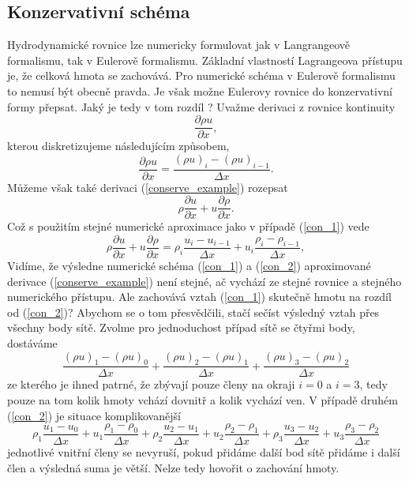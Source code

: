 \subsection{Konzervativní schéma}
Hydrodynamické rovnice lze numericky formulovat jak v Langrangeově formalismu, tak v Eulerově formalismu. Základní vlastností Lagrangeova přístupu je, že celková hmota se zachovává. Pro numerické schéma v Eulerově formalismu to nemusí být obecně pravda. Je však možne Eulerovy rovnice do konzervativní formy přepsat. Jaký je tedy v tom rozdíl ? Uvažme derivaci z rovnice kontinuity
\begin{equation}
\label{conserve_example}
\frac{\partial \rho u}{\partial x},
\end{equation}
kterou diskretizujeme následujícím způsobem,
\begin{equation}
\label{con_1}
\frac{\partial \rho u}{\partial x}=\frac{(\rho u)_{i}-(\rho u)_{i-1}}{\Delta x}.
\end{equation}
Můžeme však také derivaci (\ref{conserve_example}) rozepsat
\begin{equation}
\rho \frac{\partial u}{\partial x}+u\frac{\partial \rho}{\partial x}.
\end{equation}
Což s použitím stejné numerické aproximace jako v případě (\ref{con_1}) vede
\begin{equation}
\label{con_2}
\rho \frac{\partial u}{\partial x}+u\frac{\partial \rho}{\partial x} = \rho_i\frac{u_i-u_{i-1}}{\Delta x}+u_i\frac{\rho_i-\rho_{i-1}}{\Delta x},
\end{equation}
Vidíme, že výsledne numerické schéma (\ref{con_1}) a (\ref{con_2}) aproximované derivace (\ref{conserve_example}) není stejné, ač vychází ze stejné 
rovnice a stejného numerického přístupu. Ale zachovává vztah (\ref{con_1}) skutečně hmotu na rozdíl od (\ref{con_2})? Abychom se o tom přesvědčili, stačí 
sečíst výsledný vztah přes všechny body sítě.  Zvolme pro jednoduchost případ sítě se čtyřmi body, dostáváme
\begin{equation}
\label{conserve_form_expl_1}
\frac{(\rho u)_{1}-(\rho u)_{0}}{\Delta x}+\frac{(\rho u)_{2}-(\rho u)_{1}}{\Delta x}+\frac{(\rho u)_{3}-(\rho u)_{2}}{\Delta x}
\end{equation}
ze kterého je ihned patrné, že zbývají pouze členy na okraji $i=0$ a $i=3$, tedy pouze na tom kolik hmoty vchází dovnitř a kolik vychází ven. V případě
druhém (\ref{con_2}) je situace komplikovanější
\begin{equation}
\label{conserve_form_expl_2}
\rho_1\frac{u_1-u_{0}}{\Delta x}+u_1\frac{\rho_1-\rho_{0}}{\Delta x}+\rho_2\frac{u_2-u_{1}}{\Delta x}+u_2\frac{\rho_2-\rho_{1}}{\Delta x}+\rho_3\frac{u_3-u_{2}}{\Delta x}+u_3\frac{\rho_3-\rho_{2}}{\Delta x}
\end{equation}
jednotlivé vnitřní členy se nevyruší, pokud přidáme další bod sítě přidáme i další člen a výsledná suma je větší. Nelze tedy hovořit o zachování hmoty.

